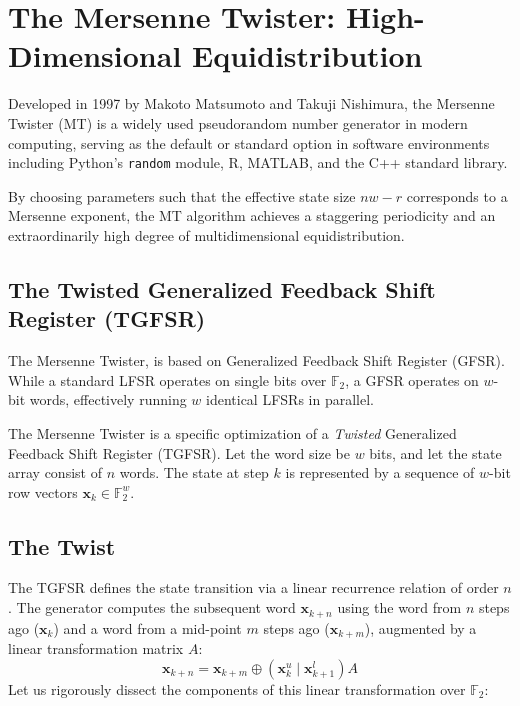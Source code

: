 
\section{The Mersenne Twister: High-Dimensional Equidistribution}

Developed in 1997 by Makoto Matsumoto and Takuji Nishimura, the Mersenne Twister (MT) is a widely used pseudorandom number generator in modern computing, serving as the default or standard option in software environments including Python's \texttt{random} module, R, MATLAB, and the C++ standard library.

By choosing parameters such that the effective state size $nw-r$ corresponds to a Mersenne exponent, the MT algorithm achieves a staggering periodicity and an extraordinarily high degree of multidimensional equidistribution.

\subsection{The Twisted Generalized Feedback Shift Register (TGFSR)}

The Mersenne Twister, is based on  Generalized Feedback Shift Register (GFSR). While a standard LFSR operates on single bits over $\mathbb{F}_2$, a GFSR operates on $w$-bit words, effectively running $w$ identical LFSRs in parallel.

The Mersenne Twister is a specific optimization of a \textit{Twisted} Generalized Feedback Shift Register (TGFSR). Let the word size be $w$ bits, and let the state array consist of $n$ words. The state at step $k$ is represented by a sequence of $w$-bit row vectors $\mathbf{x}_k \in \mathbb{F}_2^w$. 

\subsection{The Twist}
The TGFSR defines the state transition via a linear recurrence relation of order $n$. The generator computes the subsequent word $\mathbf{x}_{k+n}$ using the word from $n$ steps ago ($\mathbf{x}_k$) and a word from a mid-point $m$ steps ago ($\mathbf{x}_{k+m}$), augmented by a linear transformation matrix $A$:
\[
\mathbf{x}_{k+n} = \mathbf{x}_{k+m} \oplus \left( \mathbf{x}_k^u \mid \mathbf{x}_{k+1}^l \right) A
\]
Let us rigorously dissect the components of this linear transformation over $\mathbb{F}_2$:

